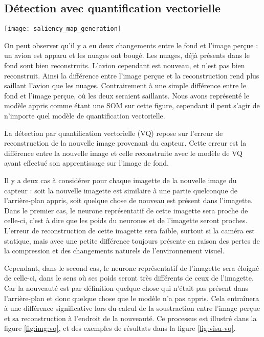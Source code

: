 	\subsection{Détection avec quantification vectorielle}

	\begin{figureth}
		\texttt{[image: saliency\_map\_generation]}
		\caption[Détection de nouveauté par quantification vectorielle]{On peut observer qu'il y a eu deux changements entre le fond et l'image perçue : un avion est apparu et les nuages ont bougé. Les nuages, déjà présents dans le fond sont bien reconstruits. L'avion cependant est nouveau, et n'est pas bien reconstruit. Ainsi la différence entre l'image perçue et la reconstruction rend plus saillant l'avion que les nuages. Contrairement à une simple différence entre le fond et l'image perçue, où les deux seraient saillants. Nous avons représenté le modèle appris comme étant une SOM sur cette figure, cependant il peut s'agir de n'importe quel modèle de quantification vectorielle.}\label{fig:img:vq}
	\end{figureth}

	La détection par quantification vectorielle (VQ) repose sur l'erreur de reconstruction de la nouvelle image provenant du capteur. Cette erreur est la différence entre la nouvelle image et celle reconstruite avec le modèle de VQ ayant effectué son apprentissage sur l'image de fond.

	Il y a deux cas à considérer pour chaque imagette de la nouvelle image du capteur : soit la nouvelle imagette est similaire à une partie quelconque de l'arrière-plan appris, soit quelque chose de nouveau est présent dans l'imagette. Dans le premier cas, le neurone représentatif de cette imagette sera proche de celle-ci, c'est à dire que les poids du neurones et de l'imagette seront proches. L'erreur de reconstruction de cette imagette sera faible, surtout si la caméra est statique, mais avec une petite différence toujours présente en raison des pertes de la compression et des changements naturels de l'environnement visuel.
	
	Cependant, dans le second cas, le neurone représentatif de l'imagette sera éloigné de celle-ci, dans le sens où ses poids seront très différents de ceux de l'imagette. Car la nouveauté est par définition quelque chose qui n'était pas présent dans l'arrière-plan et donc quelque chose que le modèle n'a pas appris. Cela entraînera à une différence significative lors du calcul de la soustraction entre l'image perçue et sa reconstruction à l'endroit de la nouveauté. Ce processus est illustré dans la figure \ref{fig:img:vq}, et des exemples de résultats dans la figure \ref{fig:visu-vq}. 

